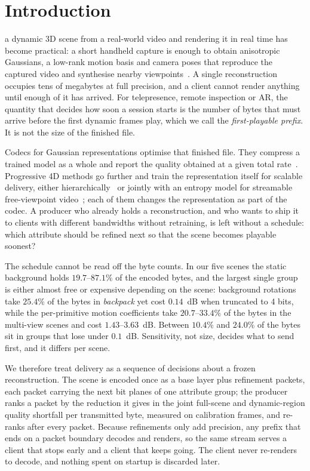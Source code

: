 \documentclass[lettersize,journal]{IEEEtran}
\begin{document}
\section{Introduction}
\label{sec:intro}

 a dynamic 3D scene from a real-world video and
rendering it in real time has become practical: a short handheld capture is
enough to obtain anisotropic Gaussians, a low-rank motion basis and camera poses
that reproduce the captured video and synthesise nearby
viewpoints~\cite{kerbl2023_3dgs,wu2024_4dgs,luiten2024_dynamic,wang2024_som}. A
single reconstruction occupies tens of megabytes at full precision, and a client
cannot render anything until enough of it has arrived. For telepresence, remote
inspection or AR, the quantity that decides how soon a session starts is the
number of bytes that must arrive before the first dynamic frames play, which we
call the \emph{first-playable prefix}. It is not the size of the finished file.

Codecs for Gaussian representations optimise that finished file. They compress a
trained model as a whole and report the quality obtained at a given total
rate~\cite{lee2024_compact3d,fan2024_lightgaussian,chen2024_hac,lee2025_tsrd4dgs}.
Progressive 4D methods go further and train the representation itself for
scalable delivery, either hierarchically~\cite{zheng2025_4dgcpro} or jointly with
an entropy model for streamable
free-viewpoint video~\cite{hu2025_4dgc,wang2025_3dgcoding}; each of them changes
the representation as part of the codec. A producer who already holds a
reconstruction, and who wants to ship it to clients with different bandwidths
without retraining, is left without a schedule: which attribute should be refined
next so that the scene becomes playable soonest?

The schedule cannot be read off the byte counts. In our five scenes the static
background holds $19.7$--$87.1\%$ of the encoded bytes, and the largest single
group is either almost free or expensive depending on the scene: background
rotations take $25.4\%$ of the bytes in \emph{backpack} yet cost $0.14$~dB when
truncated to 4 bits, while the per-primitive motion coefficients take
$20.7$--$33.4\%$ of the bytes in the multi-view scenes and cost
$1.43$--$3.63$~dB. Between $10.4\%$ and $24.0\%$ of the bytes sit in groups that
lose under $0.1$~dB. Sensitivity, not size, decides what to send first, and it
differs per scene.

We therefore treat delivery as a sequence of decisions about a frozen
reconstruction. The scene is encoded once as a base layer plus refinement
packets, each packet carrying the next bit planes of one attribute group; the
producer ranks a packet by the reduction it gives in the joint full-scene and
dynamic-region quality shortfall per transmitted byte, measured on calibration
frames, and re-ranks after every packet. Because refinements only add precision,
any prefix that ends on a packet boundary decodes and renders, so the same stream
serves a client that stops early and a client that keeps going. The client never
re-renders to decode, and nothing spent on startup is discarded later.
\end{document}
